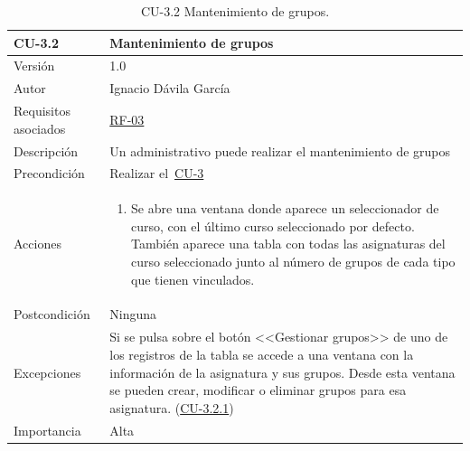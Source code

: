 \begin{table}[p]
	\centering
	\begin{tabularx}{\linewidth}{ p{} p{} }
		\toprule
		\textbf{CU-3.2}    & \textbf{Mantenimiento de grupos}\\
		\toprule
		{\small Versión}              & 1.0    \\
		{\small Autor}                & Ignacio Dávila García \\
		{\small Requisitos asociados} & \hyperref[itm:RF3]{RF-03} \\
		{\small Descripción}          & Un administrativo puede realizar el mantenimiento de grupos \\
		{\small Precondición}         & Realizar el~\hyperref[table:CU-3]{CU-3} \\
		{\small Acciones}             &
		\begin{enumerate}
			\def\labelenumi{\arabic{enumi}.}
			\tightlist
			\item Se abre una ventana donde aparece un seleccionador de curso, con el último curso seleccionado por defecto. También aparece una tabla con todas las asignaturas del curso seleccionado junto al número de grupos de cada tipo que tienen vinculados.
		\end{enumerate}\\
		{\small Postcondición}        & Ninguna \\
		{\small Excepciones}          & Si se pulsa sobre el botón <<Gestionar grupos>> de uno de los registros de la tabla se accede a una ventana con la información de la asignatura y sus grupos. Desde esta ventana se pueden crear, modificar o eliminar grupos para esa asignatura. (\hyperref[table:CU-3_2_1]{CU-3.2.1}) \\
		{\small Importancia}          & Alta \\
		\bottomrule
	\end{tabularx}
	\caption{CU-3.2 Mantenimiento de grupos.}\label{table:CU-3_2}
\end{table}
\FloatBarrier

